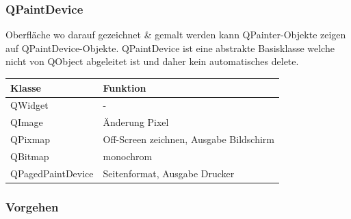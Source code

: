 \subsubsection{QPaintDevice}
Oberfläche wo darauf gezeichnet \& gemalt werden kann
QPainter-Objekte zeigen auf QPaintDevice-Objekte. QPaintDevice ist eine abstrakte Basisklasse welche nicht von QObject abgeleitet ist und daher kein automatisches delete.\\

\begin{tabular}{|l|l|}
	\hline \textbf{Klasse} & \textbf{Funktion}\\
	\hline QWidget & -\\
	\hline QImage & Änderung Pixel\\
	\hline QPixmap & Off-Screen zeichnen, Ausgabe Bildschirm\\
	\hline QBitmap & monochrom\\
	\hline QPagedPaintDevice & Seitenformat, Ausgabe Drucker\\
	\hline
\end{tabular}

\subsubsection{Vorgehen}
